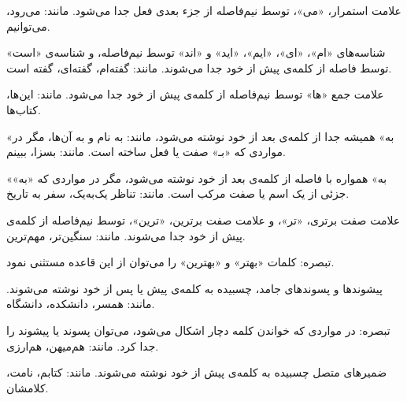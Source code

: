 \begin{شمارش}


\item
علامت استمرار، «می»، توسط نیم‌فاصله از جزء‌ بعدی فعل جدا می‌شود. مانند: می‌رود، می‌توانیم.
\item
شناسه‌های «ام»، «ای»، «ایم»، «اید» و «اند» توسط نیم‌فاصله، و شناسه‌ی «است» توسط فاصله از کلمه‌ی پیش از خود جدا می‌شوند. مانند: گفته‌ام، گفته‌ای، گفته است.
\item
علامت جمع «ها» توسط نیم‌فاصله از کلمه‌ی پیش از خود جدا می‌شود. مانند: این‌ها، کتاب‌ها.
\item
«به» همیشه جدا از کلمه‌ی بعد از خود نوشته می‌شود، مانند: به‌ نام و به آن‌ها، مگر در مواردی که «بـ» صفت یا فعل ساخته است. مانند: بسزا، ببینم.
\item
«به» همواره با فاصله از کلمه‌ی بعد از خود نوشته می‌شود، مگر در مواردی که «به» جزئی از یک اسم یا صفت مرکب است. مانند: تناظر یک‌به‌یک، سفر به تاریخ.
%
%
%

%

\item
علامت صفت برتری، «تر»، و علامت صفت برترین، «ترین»، توسط نیم‌فاصله از کلمه‌ی پیش از خود جدا می‌شوند.
مانند: سنگین‌تر، مهم‌ترین.

        تبصره‌: کلمات «بهتر» و «بهترین» را می‌توان از این قاعده مستثنی نمود.

\item
پیشوندها و پسوندهای جامد، چسبیده به کلمه‌ی پیش یا پس از خود نوشته می‌شوند. مانند: همسر، دانشکده، دانشگاه.

        تبصره‌: در مواردی که خواندن کلمه دچار اشکال می‌شود، می‌توان پسوند یا پیشوند را جدا کرد. مانند: هم‌میهن، هم‌ارزی.

\item
ضمیرهای متصل چسبیده به کلمه‌ی پیش‌ از خود نوشته می‌شوند. مانند: کتابم، نامت، کلامشان.

\end{شمارش}


